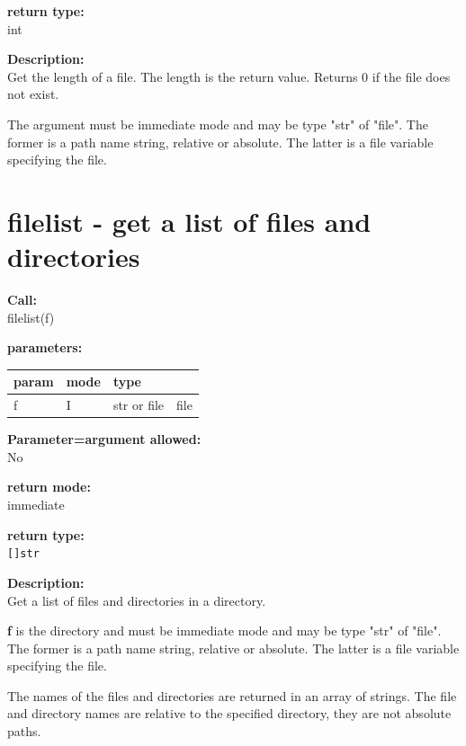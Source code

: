        {\bf return type:} \\
        int
        
        {\bf Description:} \\
        Get the length of a file. The length is the return value. Returns
        0 if the file does not exist.
 
        The argument must be immediate mode and may be type "str"
        of "file". The former is a path name string, relative or absolute.
        The latter is a file variable specifying the file.



    \section{filelist - get a list of files and directories}\label{sec:iffilelist}
        
        {\bf Call:} \\
        filelist(f)
        
        {\bf parameters:} \\
        \begin{tabular}{| l | l | l | l |}
        \hline
        param  & mode & type & \\
        \hline \hline
        f & I & str or file & file \\ \hline
        \end{tabular}
        
        {\bf Parameter=argument allowed:} \\
        No
        
        {\bf return mode:} \\
        immediate

        {\bf return type:} \\
        \verb'[]str'
        
        {\bf Description:} \\
        Get a list of files and directories in a directory.
        
        {\bf f} is the directory and must be immediate mode and may be type "str"
        of "file". The former is a path name string, relative or absolute.
        The latter is a file variable specifying the file.
                
        The names of the files and directories are returned in an array of
        strings. The file and directory names are relative to the specified
        directory, they are not absolute paths.
 


